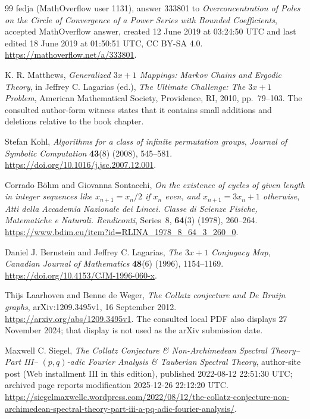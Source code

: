 \begin{thebibliography}{99}
fedja (MathOverflow user 1131),
answer 333801 to \emph{Overconcentration of Poles on the Circle of
Convergence of a Power Series with Bounded Coefficients}, accepted
MathOverflow answer, created 12 June 2019 at 03:24:50 UTC and last edited
18 June 2019 at 01:50:51 UTC, CC BY-SA 4.0.
\url{https://mathoverflow.net/a/333801}.

K. R. Matthews,
\emph{Generalized $3x + 1$ Mappings: Markov Chains and Ergodic Theory},
in Jeffrey C. Lagarias (ed.), \emph{The Ultimate Challenge: The $3x+1$
Problem}, American Mathematical Society, Providence, RI, 2010, pp.~79--103.
The consulted author-form witness states that it contains small additions and
deletions relative to the book chapter.

Stefan Kohl,
\emph{Algorithms for a class of infinite permutation groups},
\emph{Journal of Symbolic Computation} \textbf{43}(8) (2008), 545--581.
\url{https://doi.org/10.1016/j.jsc.2007.12.001}.

Corrado B\"ohm and Giovanna Sontacchi,
\emph{On the existence of cycles of given length in integer sequences like
$x_{n+1}=x_n/2$ if $x_n$ even, and $x_{n+1}=3x_n+1$ otherwise},
\emph{Atti della Accademia Nazionale dei Lincei. Classe di Scienze Fisiche,
Matematiche e Naturali. Rendiconti}, Series~8, \textbf{64}(3) (1978),
260--264.
\url{https://www.bdim.eu/item?id=RLINA_1978_8_64_3_260_0}.

Daniel J. Bernstein and Jeffrey C. Lagarias,
\emph{The $3x + 1$ Conjugacy Map},
\emph{Canadian Journal of Mathematics} \textbf{48}(6) (1996), 1154--1169.
\url{https://doi.org/10.4153/CJM-1996-060-x}.

Thijs Laarhoven and Benne de Weger,
\emph{The Collatz conjecture and De Bruijn graphs},
arXiv:1209.3495v1, 16 September 2012.
\url{https://arxiv.org/abs/1209.3495v1}.
The consulted local PDF also displays 27 November 2024; that display is not
used as the arXiv submission date.

Maxwell C. Siegel,
\emph{The Collatz Conjecture \& Non-Archimedean Spectral Theory--Part III--
$(p,q)$-adic Fourier Analysis \& Tauberian Spectral Theory}, author-site post
(Web installment III in this edition), published 2022-08-12 22:51:30 UTC;
archived page reports modification 2025-12-26 22:12:20 UTC.
\url{https://siegelmaxwellc.wordpress.com/2022/08/12/the-collatz-conjecture-non-archimedean-spectral-theory-part-iii-a-pq-adic-fourier-analysis/}.


\end{thebibliography}
